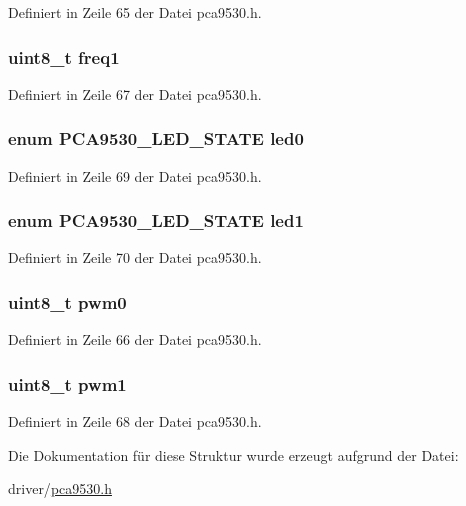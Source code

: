 Definiert in Zeile 65 der Datei pca9530.\+h.

\hypertarget{structpca9530_a05652b55717263bec9a0d63ff6690969}{}
\subsubsection[{freq1}]{\setlength{\rightskip}{0pt plus 5cm}uint8\+\_\+t freq1}\label{structpca9530_a05652b55717263bec9a0d63ff6690969}


Definiert in Zeile 67 der Datei pca9530.\+h.

\hypertarget{structpca9530_a3a42a3267d245b293db10c2cbb3330f9}{}
\subsubsection[{led0}]{\setlength{\rightskip}{0pt plus 5cm}enum {\bf P\+C\+A9530\+\_\+\+L\+E\+D\+\_\+\+S\+T\+A\+T\+E} led0}\label{structpca9530_a3a42a3267d245b293db10c2cbb3330f9}


Definiert in Zeile 69 der Datei pca9530.\+h.

\hypertarget{structpca9530_a3ac265af8bbeb022cd8ad2f21247f6ac}{}
\subsubsection[{led1}]{\setlength{\rightskip}{0pt plus 5cm}enum {\bf P\+C\+A9530\+\_\+\+L\+E\+D\+\_\+\+S\+T\+A\+T\+E} led1}\label{structpca9530_a3ac265af8bbeb022cd8ad2f21247f6ac}


Definiert in Zeile 70 der Datei pca9530.\+h.

\hypertarget{structpca9530_a2fb4d580ed22ad326b72701b98038bdc}{}
\subsubsection[{pwm0}]{\setlength{\rightskip}{0pt plus 5cm}uint8\+\_\+t pwm0}\label{structpca9530_a2fb4d580ed22ad326b72701b98038bdc}


Definiert in Zeile 66 der Datei pca9530.\+h.

\hypertarget{structpca9530_af1f85784c51fc6b57b6e713d160e6136}{}
\subsubsection[{pwm1}]{\setlength{\rightskip}{0pt plus 5cm}uint8\+\_\+t pwm1}\label{structpca9530_af1f85784c51fc6b57b6e713d160e6136}


Definiert in Zeile 68 der Datei pca9530.\+h.



Die Dokumentation für diese Struktur wurde erzeugt aufgrund der Datei\+:\begin{DoxyCompactItemize}
\item 
driver/\hyperlink{pca9530_8h}{pca9530.\+h}\end{DoxyCompactItemize}
